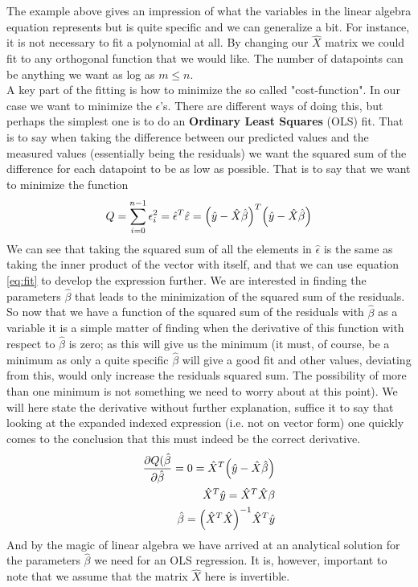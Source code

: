 The example above gives an impression of what the variables in the linear algebra equation represents but is quite specific and we can generalize a bit. For instance, it is not necessary to fit a polynomial at all. By changing our $\hat{X}$ matrix we could fit to any orthogonal function that we would like. The number of datapoints can be anything we want as log as $m\leq n$.\\

A key part of the fitting is how to minimize the so called "cost-function". In our case we want to minimize the $\epsilon$'s. There are different ways of doing this, but perhaps the simplest one is to do an \textbf{Ordinary Least Squares} (OLS) fit. That is to say when taking the difference between our predicted values and the measured values (essentially being the residuals) we want the squared sum of the difference for each datapoint to be as low as possible. That is to say that we want to minimize the function
\begin{align*}
	Q = \sum_{i=0}^{n-1}\epsilon_i^2 = \hat{\epsilon}^T\hat{\varepsilon} = \qty(\hat{y}-\hat{X}\hat{\beta})^T\qty(\hat{y}-\hat{X}\hat{\beta})
\end{align*}
We can see that taking the squared sum of all the elements in $\hat{\epsilon}$ is the same as taking the inner product of the vector with itself, and that we can use equation \ref{eq:fit} to develop the expression further. We are interested in finding the parameters $\hat{\beta}$ that leads to the minimization of the squared sum of the residuals. So now that we have a function of the squared sum of the residuals with $\hat{\beta}$ as a variable it is a simple matter of finding when the derivative of this function with respect to $\hat{\beta}$ is zero; as this will give us the minimum (it must, of course, be a minimum as only a quite specific $\hat{\beta}$ will give a good fit and other values, deviating from this, would only increase the residuals squared sum. The possibility of more than one minimum is not something we need to worry about at this point). We will here state the derivative without further explanation, suffice it to say that looking at the expanded indexed expression (i.e. not on vector form) one quickly comes to the conclusion that this must indeed be the correct derivative.
\begin{align*}
	\pdv{Q(\hat{\beta}}{\hat{\beta}} = 0 = \hat{X}^T\qty(\hat{y}-\hat{X}\hat{\beta})\\
	\hat{X}^T\hat{y} = \hat{X}^T\hat{X}\beta\\
	\hat{\beta} = \qty(\hat{X}^T\hat{X})^{-1}\hat{X}^T\hat{y}
\end{align*}
And by the magic of linear algebra we have arrived at an analytical solution for the parameters $\hat{\beta}$ we need for an OLS regression. It is, however, important to note that we assume that the matrix $\hat{X}$ here is invertible.

